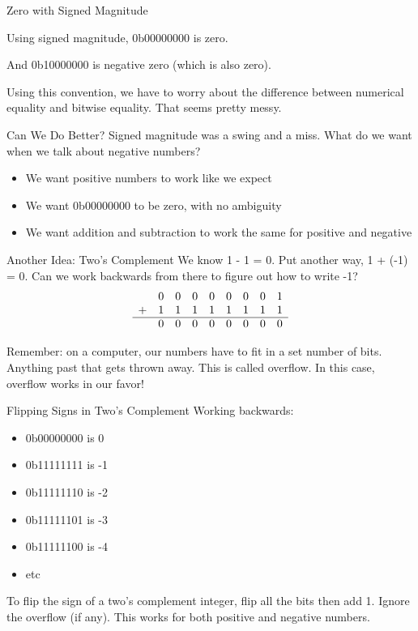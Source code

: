 \begin{frame}{Zero with Signed Magnitude}

Using signed magnitude, 0b00000000 is zero. 

And 0b10000000 is negative zero (which is also zero).

Using this convention, we have to worry about the difference between numerical equality and bitwise equality. That seems pretty messy.
\end{frame}

\begin{frame}{Can We Do Better?}
Signed magnitude was a swing and a miss. What do we want when we talk about negative numbers?
\begin{itemize}
    \item We want positive numbers to work like we expect
    \item We want 0b00000000 to be zero, with no ambiguity
    \item We want addition and subtraction to work the same for positive and negative
\end{itemize}
\end{frame}

\begin{frame}{Another Idea: Two's Complement}
    We know 1 - 1 = 0. Put another way, 1 + (-1) = 0. Can we work backwards from there to figure out how to write -1?
    \[
        \begin{array}{ccccccccc}
              & 0 & 0 & 0 & 0 & 0 & 0 & 0 & 1 \\
            + & 1 & 1 & 1 & 1 & 1 & 1 & 1 & 1 \\ 
            \hline
              & 0 & 0 & 0 & 0 & 0 & 0 & 0 & 0 \\ 
        \end{array}
        \]

Remember: on a computer, our numbers have to fit in a set number of bits. 
Anything past that gets thrown away. 
This is called overflow.
In this case, overflow works in our favor!
\end{frame}

\begin{frame}{Flipping Signs in Two's Complement}
Working backwards:
    \begin{itemize}
    \item 0b00000000 is 0
    \item 0b11111111 is -1
    \item 0b11111110 is -2
    \item 0b11111101 is -3
    \item 0b11111100 is -4
    \item etc
\end{itemize}

To flip the sign of a two's complement integer, flip all the bits then add 1. Ignore the overflow (if any). This works for both positive and negative numbers. 
\end{frame}


